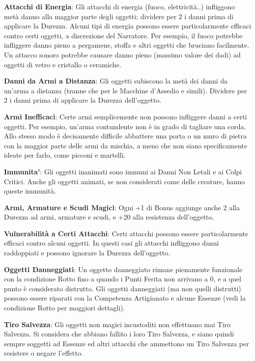 \documentclass[a4paper,11pt,twoside,openany]{book}
\begin{document}
\bigskip

\textbf{Attacchi di Energia}: Gli attacchi di energia (fuoco, elettricità..) infliggono metà danno alla maggior parte degli oggetti; dividere per 2 i danni prima di applicare la Durezza. Alcuni tipi di energia possono essere particolarmente efficaci contro certi oggetti, a discrezione del Narratore.
Per esempio, il fuoco potrebbe infliggere danno pieno a pergamene, stoffa e altri oggetti che bruciano facilmente. Un attacco sonoro potrebbe causare danno pieno (massimo valore dei dadi) ad oggetti di vetro e cristallo o ceramiche.

\textbf{Danni da Armi a Distanza}: Gli oggetti subiscono la metà dei danni da un'arma a distanza (tranne che per le Macchine d'Assedio e simili). Dividere per 2 i danni prima di applicare la Durezza dell'oggetto.

\textbf{Armi Inefficaci}: Certe armi semplicemente non possono infliggere danni a certi oggetti. Per esempio, un'arma contundente non è in grado di tagliare una corda.
Allo stesso modo è decisamente difficile abbattere una porta o un muro di pietra con la maggior parte delle armi da mischia, a meno che non siano specificamente ideate per farlo, come picconi e martelli.

\textbf{Immunita'}: Gli oggetti inanimati sono immuni ai Danni Non Letali e ai Colpi Critici. Anche gli oggetti animati, se non considerati come delle creature, hanno queste immunità.

\textbf{Armi, Armature e Scudi Magici}: Ogni +1 di Bonus aggiunge anche 2 alla Durezza ad armi, armature e scudi, e +20 alla resistenza dell'oggetto.

\textbf{Vulnerabilità a Certi Attacchi}: Certi attacchi possono essere particolarmente efficaci contro alcuni oggetti. In questi casi gli attacchi infliggono danni raddoppiati e possono ignorare la Durezza dell'oggetto.

\textbf{Oggetti Danneggiati}: Un oggetto danneggiato rimane pienamente funzionale con la condizione Rotto fino a quando i Punti Ferita non arrivano a 0, e a quel punto è considerato distrutto. Gli oggetti danneggiati (ma non quelli distrutti) possono essere riparati con la Competenza Artigianato e alcune Essenze (vedi la condizione Rotto per maggiori dettagli).

\textbf{Tiro Salvezza}: Gli oggetti non magici incustoditi non effettuano mai Tiro Salvezza. Si considera che abbiano fallito i loro Tiro Salvezza, e siano quindi sempre soggetti ad Essenze ed altri attacchi che ammettono un Tiro Salvezza per resistere o negare l'effetto.
\end{document}
